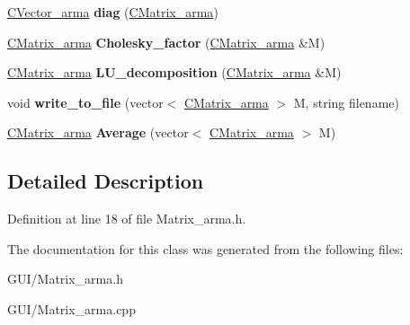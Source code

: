 \begin{DoxyCompactItemize}
\hyperlink{class_c_vector__arma}{C\+Vector\+\_\+arma} {\bfseries diag} (\hyperlink{class_c_matrix__arma}{C\+Matrix\+\_\+arma})
\item 
\mbox{\label{class_c_matrix__arma_a814dd6692223f1348b4431b27dba18a7}} 
\hyperlink{class_c_matrix__arma}{C\+Matrix\+\_\+arma} {\bfseries Cholesky\+\_\+factor} (\hyperlink{class_c_matrix__arma}{C\+Matrix\+\_\+arma} \&M)
\item 
\mbox{\label{class_c_matrix__arma_a43bb7f56e746d35837a85b997f84461e}} 
\hyperlink{class_c_matrix__arma}{C\+Matrix\+\_\+arma} {\bfseries L\+U\+\_\+decomposition} (\hyperlink{class_c_matrix__arma}{C\+Matrix\+\_\+arma} \&M)
\item 
\mbox{\label{class_c_matrix__arma_a43ab8285af5ae043811bb2bdc8c69a48}} 
void {\bfseries write\+\_\+to\+\_\+file} (vector$<$ \hyperlink{class_c_matrix__arma}{C\+Matrix\+\_\+arma} $>$ M, string filename)
\item 
\mbox{\label{class_c_matrix__arma_a2dd325ec39f80fb1cede4f117cf55fa0}} 
\hyperlink{class_c_matrix__arma}{C\+Matrix\+\_\+arma} {\bfseries Average} (vector$<$ \hyperlink{class_c_matrix__arma}{C\+Matrix\+\_\+arma} $>$ M)
\end{DoxyCompactItemize}


\subsection{Detailed Description}


Definition at line 18 of file Matrix\+\_\+arma.\+h.



The documentation for this class was generated from the following files\+:\begin{DoxyCompactItemize}
\item 
G\+U\+I/Matrix\+\_\+arma.\+h\item 
G\+U\+I/Matrix\+\_\+arma.\+cpp\end{DoxyCompactItemize}
